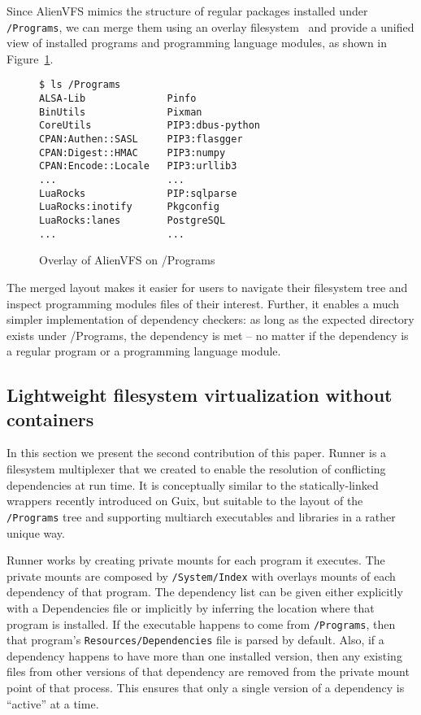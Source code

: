 \documentclass[sigplan, anonymous, 10pt]{acmart}
\begin{document}
Since AlienVFS mimics the structure of regular packages installed under
\texttt{/Programs}, we can merge them using an overlay filesystem~\cite{brown2018:overlayfs}
and provide a unified view of installed programs and programming language modules, as
shown in Figure~\ref{fig:alienvfs.merged}.

\begin{figure}[h]
    \begin{Verbatim}[frame=single]
$ ls /Programs
ALSA-Lib              Pinfo
BinUtils              Pixman
CoreUtils             PIP3:dbus-python
CPAN:Authen::SASL     PIP3:flasgger
CPAN:Digest::HMAC     PIP3:numpy
CPAN:Encode::Locale   PIP3:urllib3
...                   ...
LuaRocks              PIP:sqlparse
LuaRocks:inotify      Pkgconfig
LuaRocks:lanes        PostgreSQL
...                   ...
    \end{Verbatim}
    \caption{Overlay of AlienVFS on /Programs}
    \label{fig:alienvfs.merged}
\end{figure}

The merged layout makes it easier for users to navigate their filesystem tree
and inspect programming modules files of their interest. Further, it enables a
much simpler implementation of dependency checkers: as long as the expected
directory exists under /Programs, the dependency is met -- no matter if the
dependency is a regular program or a programming language module.

\subsection{Lightweight filesystem virtualization without containers}
In this section we present the second contribution of this paper. Runner is a
filesystem multiplexer that we created to enable the resolution of conflicting
dependencies at run time. It is conceptually similar to the statically-linked
wrappers recently introduced on Guix, but suitable to the layout of the
\texttt{/Programs} tree and supporting multiarch executables and libraries
in a rather unique way.

Runner works by creating private mounts for each program it executes. The
private mounts are composed by \texttt{/System/Index} with overlays mounts
of each dependency of that program. The dependency list can be given either
explicitly with a Dependencies file or implicitly by inferring the location
where that program is installed. If the executable happens to come from
\texttt{/Programs}, then that program's \texttt{Resources/Dependencies}
file is parsed by default. Also, if a dependency happens to have more than
one installed version, then any existing files from other versions of that
dependency are removed from the private mount point of that process. This
ensures that only a single version of a dependency is ``active'' at a time.
\end{document}
